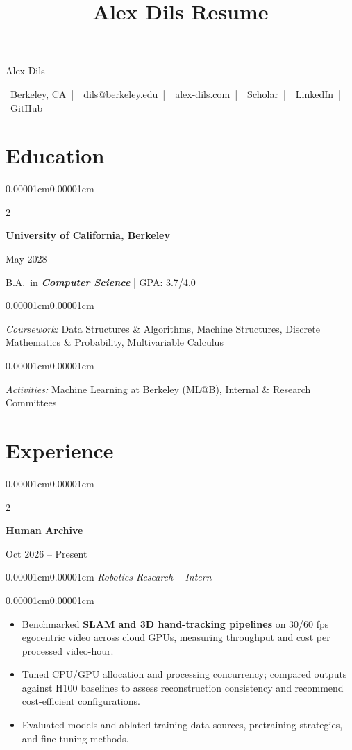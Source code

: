 \documentclass[10pt, letterpaper]{article}
\title{Alex Dils Resume}
\newenvironment{highlights}[1][18pt]{
  \begin{itemize}[topsep=0.04cm, parsep=0.02cm, partopsep=0pt, itemsep=0pt, leftmargin=#1]
}{
  \end{itemize}
}
\newenvironment{onecolentry}{
  \begin{adjustwidth}{0.00001cm}{0.00001cm}
}{
  \end{adjustwidth}
}
\newenvironment{twocolentry}[2][]{
  \onecolentry
  \def\secondColumn{#2}
  \setcolumnwidth{\fill,4.5cm}
  \begin{paracol}{2}
}{
  \switchcolumn \raggedleft \secondColumn
  \end{paracol}
  \endonecolentry
}
\newenvironment{header}{
  \setlength{\topsep}{0pt}\par\kern\topsep\linespread{1.25}
}{
  \par\kern\topsep
}
\newcommand{\experiencecompany}[1]{{\fontsize{10.5pt}{11.5pt}\selectfont\textbf{#1}}}
\newcommand{\experiencefocus}[1]{\begin{onecolentry}\small\textit{#1}\end{onecolentry}}
\begin{document}
  \fontsize{9.5pt}{10.5pt}\selectfont
  \begin{header}
    \centering
    \fontsize{22pt}{22pt}\selectfont Alex Dils

    \vspace{3pt}

    \small
    \faMapMarker\ Berkeley, CA \,|\,
    \href{mailto:dils@berkeley.edu}{\faEnvelope\ dils@berkeley.edu} \,|\,
    \href{https://www.alex-dils.com}{\faGlobe\ alex-dils.com} \,|\,
    \href{https://scholar.google.com/citations?user=0Sz8VPoAAAAJ}{\faGraduationCap\ Scholar} \,|\,
    \href{https://www.linkedin.com/in/alex-dils/}{\faLinkedin\ LinkedIn} \,|\,
    \href{https://github.com/axel-slid}{\faGithub\ GitHub}
  \end{header}
  \fontsize{9.5pt}{10.5pt}\selectfont

  \vspace{-0.18cm}

  \section{Education}
  \begin{twocolentry}{May 2028}
    \textbf{University of California, Berkeley}
  \end{twocolentry}
  B.A.\ in \textbf{\textit{Computer Science}} | GPA: 3.7/4.0

  \begin{onecolentry}
    \small \textit{Coursework:} Data Structures \& Algorithms, Machine Structures, Discrete Mathematics \& Probability, Multivariable Calculus
  \end{onecolentry}
  \begin{onecolentry}
    \small \textit{Activities:} Machine Learning at Berkeley (ML@B), Internal \& Research Committees
  \end{onecolentry}

  \section{Experience}

\begin{twocolentry}{Oct 2026 -- Present}
    \experiencecompany{Human Archive}
  \end{twocolentry}
  \experiencefocus{Robotics Research -- Intern}
  \begin{onecolentry}
    \begin{highlights}
      \item Benchmarked \textbf{SLAM and 3D hand-tracking pipelines} on 30/60 fps egocentric video across cloud GPUs, measuring throughput and cost per processed video-hour.
      \item Tuned CPU/GPU allocation and processing concurrency; compared outputs against H100 baselines to assess reconstruction consistency and recommend cost-efficient configurations.
      \item Evaluated models and ablated training data sources, pretraining strategies, and fine-tuning methods.
    \end{highlights}
  \end{onecolentry}
\end{document}
